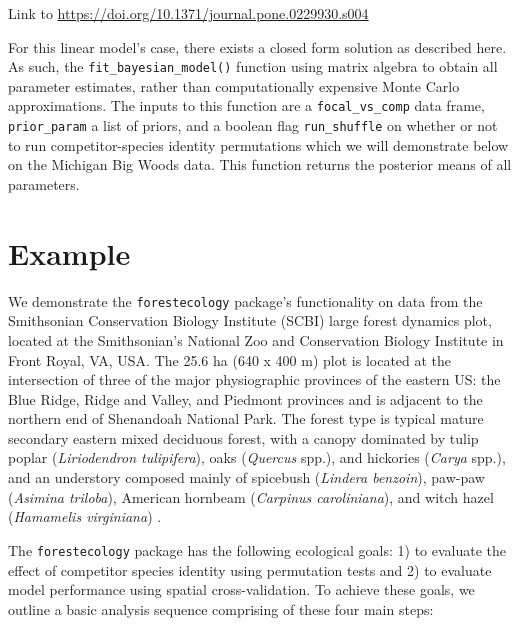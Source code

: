 \documentclass[12pt]{article}
\begin{document}
Link to \url{https://doi.org/10.1371/journal.pone.0229930.s004}

For this linear model's case, there exists a closed form solution as
described here. As such, the \texttt{fit\_bayesian\_model()} function
using matrix algebra to obtain all parameter estimates, rather than
computationally expensive Monte Carlo approximations. The inputs to this
function are a \texttt{focal\_vs\_comp} data frame,
\texttt{prior\_param} a list of priors, and a boolean flag
\texttt{run\_shuffle} on whether or not to run competitor-species
identity permutations which we will demonstrate below on the Michigan
Big Woods data. This function returns the posterior means of all
parameters.

\hypertarget{example}{%
\section{Example}\label{example}}

We demonstrate the \texttt{forestecology} package's functionality on
data from the Smithsonian Conservation Biology Institute (SCBI) large
forest dynamics plot, located at the Smithsonian's National Zoo and
Conservation Biology Institute in Front Royal, VA, USA. The 25.6 ha (640
x 400 m) plot is located at the intersection of three of the major
physiographic provinces of the eastern US: the Blue Ridge, Ridge and
Valley, and Piedmont provinces and is adjacent to the northern end of
Shenandoah National Park. The forest type is typical mature secondary
eastern mixed deciduous forest, with a canopy dominated by tulip poplar
(\emph{Liriodendron tulipifera}), oaks (\emph{Quercus} spp.), and
hickories (\emph{Carya} spp.), and an understory composed mainly of
spicebush (\emph{Lindera benzoin}), paw-paw (\emph{Asimina triloba}),
American hornbeam (\emph{Carpinus caroliniana}), and witch hazel
(\emph{Hamamelis virginiana}) \citet{bourg_initial_2013}.

The \texttt{forestecology} package has the following ecological goals:
1) to evaluate the effect of competitor species identity using
permutation tests and 2) to evaluate model performance using spatial
cross-validation. To achieve these goals, we outline a basic analysis
sequence comprising of these four main steps:
\end{document}
